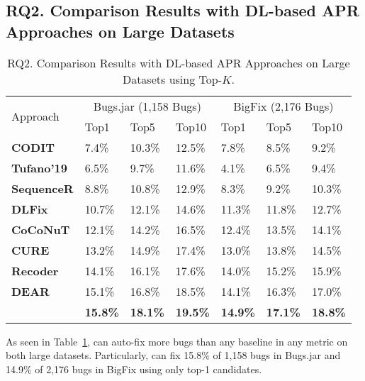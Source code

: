 \subsection{\bf RQ2. Comparison Results with DL-based APR Approaches on Large Datasets}
\label{rq2:sec}

\begin{table}[t]
	\caption{RQ2. Comparison Results with DL-based APR Approaches on Large Datasets using Top-$K$.}
	\vspace{-10pt}
        {\small
	\begin{center}
		\renewcommand{\arraystretch}{1}
		\begin{tabular}{p{1.6cm}|p{0.7cm}|p{0.7cm}|p{0.7cm}|p{0.7cm}|p{0.7cm}|p{0.7cm}}\hline
			\multirow{2}{*}{Approach}&\multicolumn{3}{c|}{Bugs.jar (1,158 Bugs)}&\multicolumn{3}{c}{BigFix (2,176 Bugs)}\\\cline{2-7}
		                          & Top1   & Top5   & Top10  & Top1   & Top5   & Top10\\
			\hline
			\textbf{CODIT}        & 7.4\%  & 10.3\% & 12.5\% & 7.8\%  & 8.5\%  & 9.2\%\\
			\textbf{Tufano'19}  & 6.5\%  & 9.7\%  & 11.6\% & 4.1\%  & 6.5\%  & 9.4\%\\
			\textbf{SequenceR}    & 8.8\%  & 10.8\% & 12.9\% & 8.3\%  & 9.2\%  & 10.3\%\\
			\textbf{DLFix}        & 10.7\% & 12.1\% & 14.6\% & 11.3\% & 11.8\% & 12.7\%\\
			\textbf{CoCoNuT}      & 12.1\% & 14.2\% & 16.5\% & 12.4\% & 13.5\% & 14.1\%\\
			\textbf{CURE}         & 13.2\% & 14.9\% & 17.4\% & 13.0\% & 13.8\% & 14.5\%\\
                        \textbf{Recoder}         & 14.1\% & 16.1\% & 17.6\% & 14.0\% & 15.2\% & 15.9\%\\
                        \textbf{DEAR}         & 15.1\% & 16.8\% & 18.5\% & 14.1\% & 16.3\% & 17.0\%\\
			\hline
			\textbf{\tool}        & \textbf{15.8\%} & \textbf{18.1\%} & \textbf{19.5\%} & \textbf{14.9\%} & \textbf{17.1\%} & \textbf{18.8\%}\\
			\hline
		\end{tabular}
		\label{RQ2_results}
	\end{center}
        }
\end{table}


As seen in Table~\ref{RQ2_results}, {\tool} can auto-fix more bugs
than any baseline in any metric on both large datasets.  Particularly,
{\tool} can fix 15.8\% of 1,158 bugs in Bugs.jar and 14.9\% of 2,176
bugs in BigFix using only top-1 candidates.

